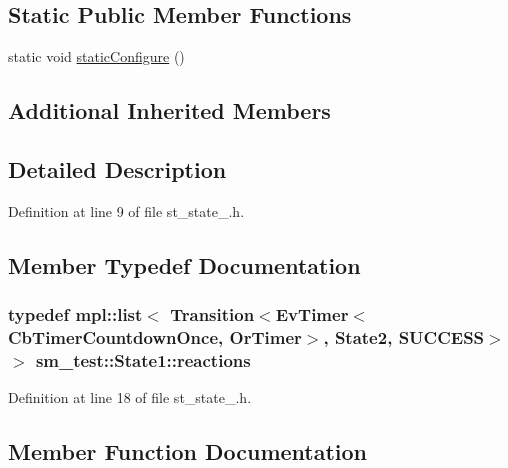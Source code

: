 \subsection*{Static Public Member Functions}
\begin{DoxyCompactItemize}
\item 
static void \hyperlink{structsm__test_1_1State1_aa6fb700b8ffff0c82ae29d17933393d1}{static\+Configure} ()
\end{DoxyCompactItemize}
\subsection*{Additional Inherited Members}


\subsection{Detailed Description}


Definition at line 9 of file st\+\_\+state\+\_.\+h.



\subsection{Member Typedef Documentation}
\subsubsection[{\texorpdfstring{reactions}{reactions}}]{\setlength{\rightskip}{0pt plus 5cm}typedef mpl\+::list$<$ Transition$<${\bf Ev\+Timer}$<${\bf Cb\+Timer\+Countdown\+Once}, {\bf Or\+Timer}$>$, {\bf State2}, {\bf S\+U\+C\+C\+E\+SS}$>$ $>$ {\bf sm\+\_\+test\+::\+State1\+::reactions}}\hypertarget{structsm__test_1_1State1_a6c078d96ea6d143f61013818aaba7030}{}\label{structsm__test_1_1State1_a6c078d96ea6d143f61013818aaba7030}


Definition at line 18 of file st\+\_\+state\+\_.\+h.



\subsection{Member Function Documentation}

